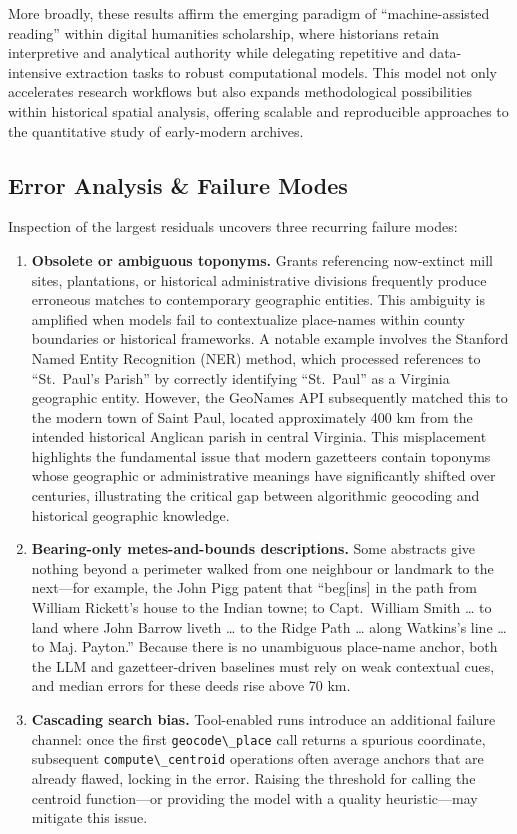 More broadly, these results affirm the emerging paradigm of
``machine-assisted reading'' within digital humanities scholarship,
where historians retain interpretive and analytical authority while
delegating repetitive and data-intensive extraction tasks to robust
computational models. This model not only accelerates research workflows
but also expands methodological possibilities within historical spatial
analysis, offering scalable and reproducible approaches to the
quantitative study of early-modern archives.

\subsection{Error Analysis \& Failure
Modes}\label{error-analysis-failure-modes}

Inspection of the largest residuals uncovers three recurring failure
modes:

\begin{enumerate}
\def\labelenumi{\arabic{enumi}.}
\item
  \textbf{Obsolete or ambiguous toponyms.} Grants referencing
  now-extinct mill sites, plantations, or historical administrative
  divisions frequently produce erroneous matches to contemporary
  geographic entities. This ambiguity is amplified when models fail to
  contextualize place-names within county boundaries or historical
  frameworks. A notable example involves the Stanford Named Entity
  Recognition (NER) method, which processed references to ``St.~Paul's
  Parish'' by correctly identifying ``St.~Paul'' as a Virginia
  geographic entity. However, the GeoNames API subsequently matched this
  to the modern town of Saint Paul, located approximately 400 km from
  the intended historical Anglican parish in central Virginia. This
  misplacement highlights the fundamental issue that modern gazetteers
  contain toponyms whose geographic or administrative meanings have
  significantly shifted over centuries, illustrating the critical gap
  between algorithmic geocoding and historical geographic knowledge.
\item
  \textbf{Bearing-only metes-and-bounds descriptions.} Some abstracts
  give nothing beyond a perimeter walked from one neighbour or landmark
  to the next---for example, the John Pigg patent that ``beg{[}ins{]} in
  the path from William Rickett's house to the Indian towne; to
  Capt.~William Smith \ldots{} to land where John Barrow liveth \ldots{}
  to the Ridge Path \ldots{} along Watkins's line \ldots{} to Maj.
  Payton.'' Because there is no unambiguous place-name anchor, both the
  LLM and gazetteer-driven baselines must rely on weak contextual cues,
  and median errors for these deeds rise above 70 km.
\item
  \textbf{Cascading search bias.} Tool-enabled runs introduce an
  additional failure channel: once the first
  \passthrough{\lstinline!geocode\_place!} call returns a spurious
  coordinate, subsequent \passthrough{\lstinline!compute\_centroid!}
  operations often average anchors that are already flawed, locking in
  the error. Raising the threshold for calling the centroid
  function---or providing the model with a quality heuristic---may
  mitigate this issue.
\end{enumerate}

